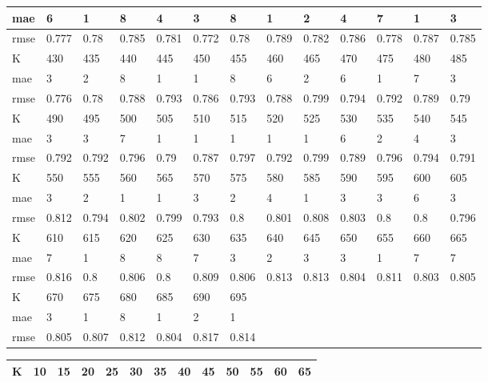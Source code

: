 \begin{appendices}
\begin{center}
\begin{tabularx}{\textwidth}{|l|X|X|X|X|X|X|X|X|X|X|X|X|}
		mae & 6 & 1 & 8 & 4 & 3 & 8 & 1 & 2 & 4 & 7 & 1 & 3 \\ \hline 
		rmse & 0.777 & 0.78 & 0.785 & 0.781 & 0.772 & 0.78 & 0.789 & 0.782 & 0.786 & 0.778 & 0.787 & 0.785 \\ \hline 
		\hline 
		K & 430 & 435 & 440 & 445 & 450 & 455 & 460 & 465 & 470 & 475 & 480 & 485 \\ \hline 
		mae & 3 & 2 & 8 & 1 & 1 & 8 & 6 & 2 & 6 & 1 & 7 & 3 \\ \hline 
		rmse & 0.776 & 0.78 & 0.788 & 0.793 & 0.786 & 0.793 & 0.788 & 0.799 & 0.794 & 0.792 & 0.789 & 0.79 \\ \hline 
		\hline 
		K & 490 & 495 & 500 & 505 & 510 & 515 & 520 & 525 & 530 & 535 & 540 & 545 \\ \hline 
		mae & 3 & 3 & 7 & 1 & 1 & 1 & 1 & 1 & 6 & 2 & 4 & 3 \\ \hline 
		rmse & 0.792 & 0.792 & 0.796 & 0.79 & 0.787 & 0.797 & 0.792 & 0.799 & 0.789 & 0.796 & 0.794 & 0.791 \\ \hline 
		\hline 
		K & 550 & 555 & 560 & 565 & 570 & 575 & 580 & 585 & 590 & 595 & 600 & 605 \\ \hline 
		mae & 3 & 2 & 1 & 1 & 3 & 2 & 4 & 1 & 3 & 3 & 6 & 3 \\ \hline 
		rmse & 0.812 & 0.794 & 0.802 & 0.799 & 0.793 & 0.8 & 0.801 & 0.808 & 0.803 & 0.8 & 0.8 & 0.796 \\ \hline 
		\hline 
		K & 610 & 615 & 620 & 625 & 630 & 635 & 640 & 645 & 650 & 655 & 660 & 665 \\ \hline 
		mae & 7 & 1 & 8 & 8 & 7 & 3 & 2 & 3 & 3 & 1 & 7 & 7 \\ \hline 
		rmse & 0.816 & 0.8 & 0.806 & 0.8 & 0.809 & 0.806 & 0.813 & 0.813 & 0.804 & 0.811 & 0.803 & 0.805 \\ \hline 
		\hline 
		K & 670 & 675 & 680 & 685 & 690 & 695  & & & & & & \\ \hline 
		mae & 3 & 1 & 8 & 1 & 2 & 1 & & & & & &  \\ \hline 
		rmse & 0.805 & 0.807 & 0.812 & 0.804 & 0.817 & 0.814  & & & & & & \\ \hline 
	\end{tabularx} 
\end{center}
\begin{center} \label{tab13}
	\begin{tabularx}{\textwidth}{|l|X|X|X|X|X|X|X|X|X|X|X|X|} 
		\hline 
		K & 10 & 15 & 20 & 25 & 30 & 35 & 40 & 45 & 50 & 55 & 60 & 65 \\ \hline 

\end{tabularx}
\end{center}
\end{appendices}
